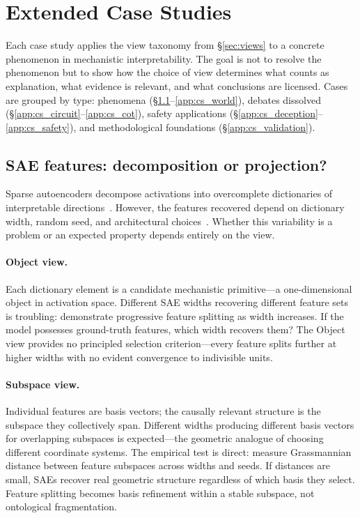 \documentclass{article}
\begin{document}
\section{Extended Case Studies}\label{app:case_studies}

Each case study applies the view taxonomy from \S\ref{sec:views} to a
concrete phenomenon in mechanistic interpretability. The goal is not to
resolve the phenomenon but to show how the choice of view determines what
counts as explanation, what evidence is relevant, and what conclusions
are licensed. Cases are grouped by type: phenomena
(\S\ref{app:cs_sae}--\ref{app:cs_world}), debates dissolved
(\S\ref{app:cs_circuit}--\ref{app:cs_cot}), safety applications
(\S\ref{app:cs_deception}--\ref{app:cs_safety}), and methodological
foundations (\S\ref{app:cs_validation}).


\subsection{SAE features: decomposition or projection?}\label{app:cs_sae}

Sparse autoencoders decompose activations into overcomplete dictionaries
of interpretable directions~\citep{bricken2023}. However, the features
recovered depend on dictionary width, random seed, and architectural
choices~\citep{leask2025}. Whether this variability is a problem or an
expected property depends entirely on the view.

\paragraph{Object view.}
Each dictionary element is a candidate mechanistic primitive---a
one-dimensional object in activation space. Different SAE widths
recovering different feature sets is troubling: \citet{bricken2023}
demonstrate progressive feature splitting as width increases. If the
model possesses ground-truth features, which width recovers them? The
Object view provides no principled selection criterion---every feature
splits further at higher widths with no evident convergence to
indivisible units.

\paragraph{Subspace view.}
Individual features are basis vectors; the causally relevant structure is
the subspace they collectively span. Different widths producing different
basis vectors for overlapping subspaces is expected---the geometric
analogue of choosing different coordinate systems. The empirical test is
direct: measure Grassmannian distance between feature subspaces across
widths and seeds. If distances are small, SAEs recover real geometric
structure regardless of which basis they select. Feature splitting
becomes basis refinement within a stable subspace, not ontological
fragmentation.
\end{document}
